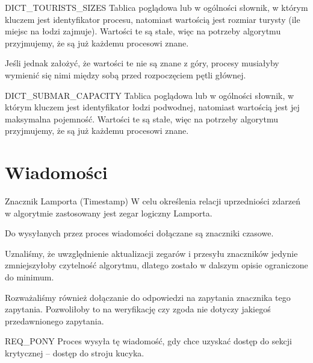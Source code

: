 \documentclass{beamer}
\begin{document}
\begin{frame}{DICT\_TOURISTS\_SIZES}
    \internallinenumbers
    \resetlinenumber[1]
    Tablica poglądowa lub w ogólności słownik, w którym kluczem jest identyfikator procesu, natomiast wartością jest rozmiar turysty (ile miejsc na łodzi zajmuje). Wartości te są stałe, więc na potrzeby algorytmu przyjmujemy, że są już każdemu procesowi znane.
    
    \vspace{1cm}
    Jeśli jednak założyć, że wartości te nie są znane z góry, procesy musiałyby wymienić się nimi między sobą przed rozpoczęciem pętli głównej.
\end{frame}

\begin{frame}{DICT\_SUBMAR\_CAPACITY}
    \internallinenumbers
    \resetlinenumber[1]
    Tablica poglądowa lub w ogólności słownik, w którym kluczem jest identyfikator łodzi podwodnej, natomiast wartością jest jej maksymalna pojemność. Wartości te są stałe, więc na potrzeby algorytmu przyjmujemy, że są już każdemu procesowi znane.
\end{frame}

\section{Wiadomości}
\begin{frame}{Znacznik Lamporta (Timestamp)}
    \internallinenumbers
    \resetlinenumber[1]
    W celu określenia relacji uprzedniości zdarzeń w algorytmie zastosowany jest zegar logiczny Lamporta.

    \vspace{0.7cm}
    Do wysyłanych przez proces wiadomości dołączane są znaczniki czasowe.
    
    \vspace{0.7cm}
    Uznaliśmy, że uwzględnienie aktualizacji zegarów i przesyłu znaczników jedynie zmniejszyłoby czytelność algorytmu, dlatego zostało w dalszym opisie ograniczone do minimum.

    \vspace{0.7cm}
    Rozważaliśmy również dołączanie do odpowiedzi na zapytania znacznika tego zapytania. Pozwoliłoby to na weryfikację czy zgoda nie dotyczy jakiegoś przedawnionego zapytania.
\end{frame}

\begin{frame}{REQ\_PONY}
    \internallinenumbers
    \resetlinenumber[1]
    Proces wysyła tę wiadomość, gdy chce uzyskać dostęp do sekcji krytycznej – dostęp do stroju kucyka.
\end{frame}
\end{document}
